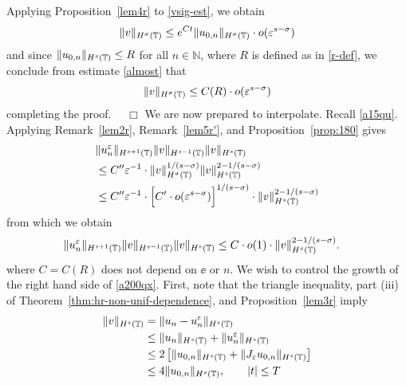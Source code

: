 Applying Proposition~\ref{lem4r} to \eqref{vsig-est}, we obtain 
\begin{equation}
\label{almost}
\begin{split}
\|v\|_{H^\sigma (\mathbb{T})} \le e^{Ct} \|u_{0,n}\|_{H^\sigma(\mathbb{T})} \cdot
o(\varepsilon^{s-\sigma})
\end{split}
\end{equation}
and since $\|u_{0,n}\|_{H^s(\mathbb{T})} \le R$ for all $n \in \mathbb{N}$, where
$R$ is defined as in \eqref{r-def}, we conclude from estimate \eqref{almost} that
\begin{equation*}
\begin{split}
\|v\|_{H^\sigma(\mathbb{T})} \le C(R) \cdot o(\varepsilon^{s-\sigma})
\end{split}
\end{equation*}
completing the proof. $\quad \Box$
We are now prepared to interpolate. Recall \eqref{a15qu}. Applying Remark~\ref{lem2r}, Remark~\ref{lem5r'}, and
Proposition~\ref{prop:180} gives
\begin{equation*}
\begin{split}
& \|u^\varepsilon_n \|_{H^{s+1}(\mathbb{T})} \|v\|_{H^{s-1}(\mathbb{T})} \|v\|_{H^s
(\mathbb{T})}
\\
&\le C'' \varepsilon^{-1} \cdot \|v\|_{H^\sigma(\mathbb{T})}^{1/(s-\sigma)}
\|v\|_{H^s(\mathbb{T})}^{2 - 1/(s- \sigma)}
\\
& \le C'' \varepsilon^{-1} \cdot \Big [C' \cdot o(\varepsilon^{s- \sigma})\Big ]^{1/(s-\sigma)}
\cdot \|v\|_{H^s(\mathbb{T})}^{2- 1/(s-\sigma)}
\end{split}
\end{equation*}
from which we obtain
\begin{equation}
\begin{split}
\label{a200qx}
\|u^\varepsilon_n\|_{H^{s+1}(\mathbb{T})} \|v\|_{H^{s-1}(\mathbb{T})} \|v \|_{H^s(\mathbb{T})}
& \le  C \cdot o(1) \cdot \|v\|_{H^s(\mathbb{T})}^{2- 1/(s-\sigma)}.
\end{split}
\end{equation}
where $C=C(R)$ does not depend on $\ee$ or $n$. We wish to control the growth of the right hand side of \eqref{a200qx}.
First, note that the triangle inequality, part (iii) of Theorem~\ref{thm:hr-non-unif-dependence}, and Proposition~\ref{lem3r} imply
\begin{equation}
\begin{split}
\|v\|_{H^s(\mathbb{T})} & = \|u_n - u^\varepsilon_n \|_{H^s(\mathbb{T})} 
\\
& \le \|u_n \|_{H^s(\mathbb{T})} + \|u^\varepsilon_n\|_{H^s(\mathbb{T})}
\\
& \le 2\left[ \|u_{0,n} \|_{H^s(\mathbb{T})} + \|J_\varepsilon u_{0,n}
\|_{H^s(\mathbb{T})} \right]
\\
& \le 4 \|u_{0,n} \|_{H^s(\mathbb{T})}, \qquad |t| \le T
\label{agrowth_v}
\end{split}
\end{equation}
